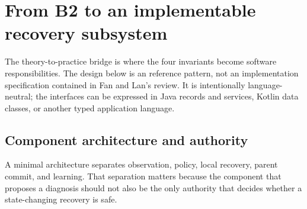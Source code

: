 \section{From B2 to an implementable recovery subsystem}
\label{sec:ch13-implementation}

The theory-to-practice bridge is where the four invariants become software responsibilities. The design below is an \EngineeringLabel{} reference pattern, not an implementation specification contained in Fan and Lan's review. It is intentionally language-neutral; the interfaces can be expressed in Java records and services, Kotlin data classes, or another typed application language.

\subsection{Component architecture and authority}
\label{subsec:ch13-components}

A minimal architecture separates observation, policy, local recovery, parent commit, and learning. That separation matters because the component that proposes a diagnosis should not also be the only authority that decides whether a state-changing recovery is safe.

